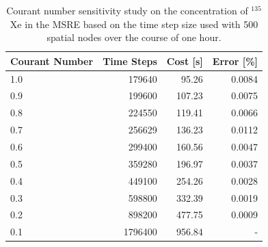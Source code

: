 \documentclass{style/nseJournal}
\begin{document}
\begin{table}[!ht]
    \centering
    \caption{Courant number sensitivity study on the concentration of $^{135}$Xe in the MSRE based on the time step size used with 500 spatial nodes  over the course of one hour.}
    \begin{tabular}{l r r r}
    \hline
Courant Number & Time Steps & Cost [s] & Error [\%] \\
\hline
1.0 & 179640 & 95.26 & 0.0084 \\
0.9 & 199600 & 107.23 & 0.0075 \\
0.8 & 224550 & 119.41 & 0.0066 \\
0.7 & 256629 & 136.23 & 0.0112 \\
0.6 & 299400 & 160.56 & 0.0047 \\
0.5 & 359280 & 196.97 & 0.0037 \\
0.4 & 449100 & 254.26 & 0.0028 \\
0.3 & 598800 & 332.39 & 0.0019 \\
0.2 & 898200 & 477.75 & 0.0009 \\
0.1 & 1796400 & 956.84 & - \\
\hline
    \end{tabular}
    \label{tab:couranthour}
\end{table}

\end{document}
